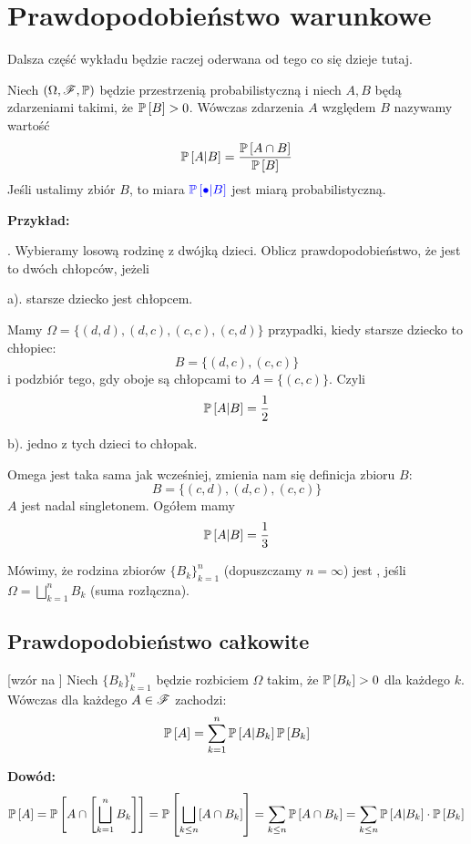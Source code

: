 \section{Prawdopodobieństwo warunkowe}

Dalsza część wykładu będzie raczej oderwana od tego co się dzieje tutaj.

Niech $(\Omega,\mathcal{F},\mathbb{P})$ będzie przestrzenią probabilistyczną i niech $A, B$ będą zdarzeniami takimi, że $\mathbb{P}\left[B\right]>0$. Wówczas  zdarzenia $A$ względem $B$ nazywamy wartość
$$\mathbb{P}\left[A|B\right]={\mathbb{P}\left[A\cap B\right]\over\mathbb{P}\left[B\right]}$$
Jeśli ustalimy zbiór $B$, to miara $\color{blue}\mathbb{P}\left[\bullet|B\right]$ jest miarą probabilistyczną.

\textbf{Przykład:}

. Wybieramy losową rodzinę z dwójką dzieci. Oblicz prawdopodobieństwo, że jest to dwóch chłopców, jeżeli

\indent a). starsze dziecko jest chłopcem.

Mamy $\Omega=\{(d, d), (d, c), (c, c), (c, d)\}$ przypadki, kiedy starsze dziecko to chłopiec:
$$B=\{(d, c), (c, c)\}$$
i podzbiór tego, gdy oboje są chłopcami to $A=\{(c, c)\}$. Czyli
$$\mathbb{P}\left[A|B\right]={1\over 2}$$

\indent b). jedno z tych dzieci to chłopak.

Omega jest taka sama jak wcześniej, zmienia nam się definicja zbioru $B$:
$$B=\{(c, d), (d, c), (c, c)\}$$
$A$ jest nadal singletonem. Ogółem mamy
$$\mathbb{P}\left[A|B\right]=\frac13$$

Mówimy, że rodzina zbiorów $\{B_k\}_{k=1}^n$ (dopuszczamy $n=\infty$) jest , jeśli $\Omega=\bigsqcup_{k=1}^nB_k$ (suma rozłączna).

\subsection{Prawdopodobieństwo całkowite}

 [wzór na ] Niech $\{B_k\}_{k=1}^n$ będzie rozbiciem $\Omega$ takim, że $\mathbb{P}\left[B_k\right]>0$ dla każdego $k$. Wówczas dla każdego $A\in\mathcal{F}$ zachodzi:
$$\mathbb{P}\left[A\right]=\sum\limits_{k=1}^n\mathbb{P}\left[A|B_k\right]\mathbb{P}\left[B_k\right]$$

\textbf{Dowód:}
$$\mathbb{P}\left[A\right]=\mathbb{P}\left[A\cap\left[\bigsqcup\limits_{k=1}^nB_k\right]\right]=\mathbb{P}\left[\bigsqcup\limits_{k\leq n}[A\cap B_k]\right]=\sum\limits_{k\leq n}\mathbb{P}\left[A\cap B_k\right]=\sum\limits_{k\leq n}\mathbb{P}\left[A|B_k\right]\cdot\mathbb{P}\left[B_k\right]$$

